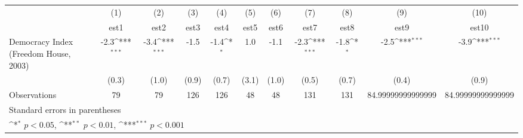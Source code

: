 {
\def\sym#1{\ifmmode^{#1}\else\(^{#1}\)\fi}
\begin{tabular}{l*{10}{c}}
\hline\hline
                    &\multicolumn{1}{c}{(1)}         &\multicolumn{1}{c}{(2)}         &\multicolumn{1}{c}{(3)}         &\multicolumn{1}{c}{(4)}         &\multicolumn{1}{c}{(5)}         &\multicolumn{1}{c}{(6)}         &\multicolumn{1}{c}{(7)}         &\multicolumn{1}{c}{(8)}         &\multicolumn{1}{c}{(9)}         &\multicolumn{1}{c}{(10)}         \\
                    &        est1         &        est2         &        est3         &        est4         &        est5         &        est6         &        est7         &        est8         &        est9         &       est10         \\
\hline
Democracy Index (Freedom House, 2003)&        -2.3\sym{***}&        -3.4\sym{***}&        -1.5         &        -1.4\sym{*}  &         1.0         &        -1.1         &        -2.3\sym{***}&        -1.8\sym{*}  &        -2.5\sym{***}&        -3.9\sym{***}\\
                    &       (0.3)         &       (1.0)         &       (0.9)         &       (0.7)         &       (3.1)         &       (1.0)         &       (0.5)         &       (0.7)         &       (0.4)         &       (0.9)         \\
\hline
Observations        &          79         &          79         &         126         &         126         &          48         &          48         &         131         &         131         &84.99999999999999         &84.99999999999999         \\
\hline\hline
\multicolumn{11}{l}{\footnotesize Standard errors in parentheses}\\
\multicolumn{11}{l}{\footnotesize \sym{*} \(p<0.05\), \sym{**} \(p<0.01\), \sym{***} \(p<0.001\)}\\
\end{tabular}
}
